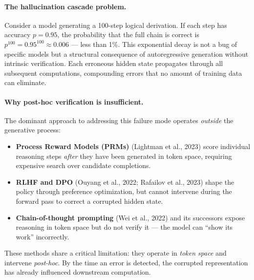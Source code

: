 \documentclass[11pt,a4paper]{article}
\theoremstyle{definition}
\begin{document}
\paragraph{The hallucination cascade problem.} Consider a model generating a 100-step logical derivation. If each step has accuracy $p = 0.95$, the probability that the full chain is correct is $p^{100} = 0.95^{100} \approx 0.006$ --- less than 1\%. This exponential decay is not a bug of specific models but a structural consequence of autoregressive generation without intrinsic verification. Each erroneous hidden state propagates through all subsequent computations, compounding errors that no amount of training data can eliminate.

\paragraph{Why post-hoc verification is insufficient.} The dominant approach to addressing this failure mode operates \textit{outside} the generative process:
\begin{itemize}
    \item \textbf{Process Reward Models (PRMs)} (Lightman et al., 2023) score individual reasoning steps \textit{after} they have been generated in token space, requiring expensive search over candidate completions.
    \item \textbf{RLHF and DPO} (Ouyang et al., 2022; Rafailov et al., 2023) shape the policy through preference optimization, but cannot intervene during the forward pass to correct a corrupted hidden state.
    \item \textbf{Chain-of-thought prompting} (Wei et al., 2022) and its successors expose reasoning in token space but do not verify it --- the model can ``show its work'' incorrectly.
\end{itemize}
These methods share a critical limitation: they operate in \textit{token space} and intervene \textit{post-hoc}. By the time an error is detected, the corrupted representation has already influenced downstream computation.
\end{document}
